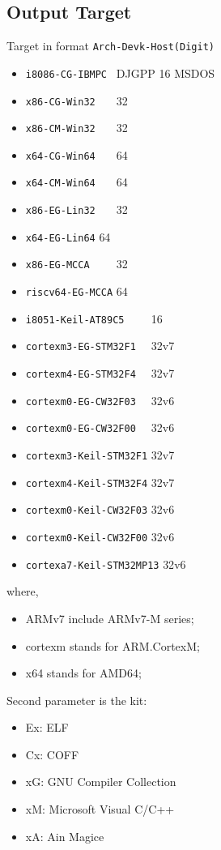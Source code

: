 
\subsection{Output Target}

Target in format \verb`Arch-Devk-Host(Digit)`
\begin{itemize}
\item \verb`i8086-CG-IBMPC ` {DJGPP 16 MSDOS}
\item \verb`x86-CG-Win32   ` {32}
\item \verb`x86-CM-Win32   ` {32}
\item \verb`x64-CG-Win64   ` {64}
\item \verb`x64-CM-Win64   ` {64}
\item \verb`x86-EG-Lin32   ` {32}
\item \verb`x64-EG-Lin64`    {64}
\item \verb`x86-EG-MCCA    ` {32}
\item \verb`riscv64-EG-MCCA` {64}
\item \verb`i8051-Keil-AT89C5    ` {16}
\item \verb`cortexm3-EG-STM32F1  ` {32}v7
\item \verb`cortexm4-EG-STM32F4  ` {32}v7
\item \verb`cortexm0-EG-CW32F03  ` {32}v6
\item \verb`cortexm0-EG-CW32F00  ` {32}v6
\item \verb`cortexm3-Keil-STM32F1` {32}v7
\item \verb`cortexm4-Keil-STM32F4` {32}v7
\item \verb`cortexm0-Keil-CW32F03` {32}v6
\item \verb`cortexm0-Keil-CW32F00` {32}v6
\item \verb`cortexa7-Keil-STM32MP13` {32}v6
\end{itemize}

where,
\begin{itemize}
\item ARMv7 include ARMv7-M series;
\item cortexm stands for ARM.CortexM;
\item x64 stands for AMD64;
\end{itemize}

Second parameter is the kit:
\begin{itemize}
\item Ex: ELF
\item Cx: COFF
\item xG: GNU Compiler Collection
\item xM: Microsoft Visual C/C++
\item xA: Ain Magice
\end{itemize}

